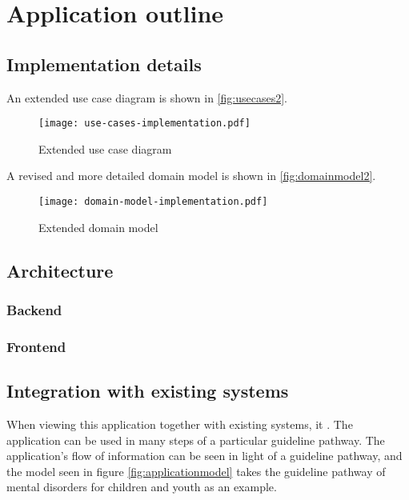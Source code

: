 \chapter{Application outline}
\label{ch:outline}

\section{Implementation details}

An extended use case diagram is shown in \autoref{fig:usecases2}.

\begin{figure}
    \centering
    \texttt{[image: use-cases-implementation.pdf]}
    \caption{Extended use case diagram}
    \label{fig:usecases2}
\end{figure}

A revised and more detailed domain model is shown in \autoref{fig:domainmodel2}.

\begin{figure}
    \centering
    \texttt{[image: domain-model-implementation.pdf]}
    \caption{Extended domain model}
    \label{fig:domainmodel2}
\end{figure}

\section{Architecture}

\subsection{Backend}

\subsection{Frontend}

\section{Integration with existing systems}

When viewing this application together with existing systems, it . The application can be used in many steps of a particular guideline pathway. The application's flow of information can be seen in light of a guideline pathway, and the model seen in figure \ref{fig:applicationmodel} takes the guideline pathway of mental disorders for children and youth \autocite{helsedirektoratet2019} as an example.

